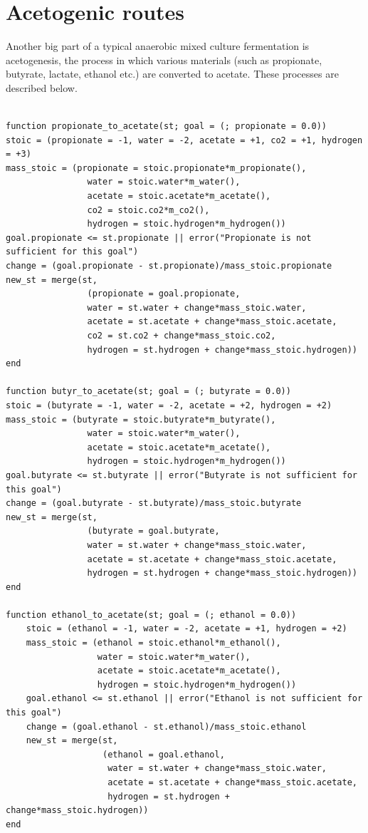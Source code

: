 \documentclass[11pt]{article}
\begin{document}
\section{Acetogenic routes}
\label{sec:org7d047e0}
Another big part of a typical anaerobic mixed culture fermentation is acetogenesis, the process in which various materials (such as propionate, butyrate, lactate, ethanol etc.) are converted to acetate. These processes are described below.

\begin{verbatim}

function propionate_to_acetate(st; goal = (; propionate = 0.0))
stoic = (propionate = -1, water = -2, acetate = +1, co2 = +1, hydrogen = +3)
mass_stoic = (propionate = stoic.propionate*m_propionate(),
                water = stoic.water*m_water(),
                acetate = stoic.acetate*m_acetate(),
                co2 = stoic.co2*m_co2(),
                hydrogen = stoic.hydrogen*m_hydrogen())
goal.propionate <= st.propionate || error("Propionate is not sufficient for this goal")
change = (goal.propionate - st.propionate)/mass_stoic.propionate
new_st = merge(st,
                (propionate = goal.propionate,
                water = st.water + change*mass_stoic.water,
                acetate = st.acetate + change*mass_stoic.acetate,
                co2 = st.co2 + change*mass_stoic.co2,
                hydrogen = st.hydrogen + change*mass_stoic.hydrogen))
end

function butyr_to_acetate(st; goal = (; butyrate = 0.0))
stoic = (butyrate = -1, water = -2, acetate = +2, hydrogen = +2)
mass_stoic = (butyrate = stoic.butyrate*m_butyrate(),
                water = stoic.water*m_water(),
                acetate = stoic.acetate*m_acetate(),
                hydrogen = stoic.hydrogen*m_hydrogen())
goal.butyrate <= st.butyrate || error("Butyrate is not sufficient for this goal")
change = (goal.butyrate - st.butyrate)/mass_stoic.butyrate
new_st = merge(st,
                (butyrate = goal.butyrate,
                water = st.water + change*mass_stoic.water,
                acetate = st.acetate + change*mass_stoic.acetate,
                hydrogen = st.hydrogen + change*mass_stoic.hydrogen))
end

function ethanol_to_acetate(st; goal = (; ethanol = 0.0))
    stoic = (ethanol = -1, water = -2, acetate = +1, hydrogen = +2)
    mass_stoic = (ethanol = stoic.ethanol*m_ethanol(),
                  water = stoic.water*m_water(),
                  acetate = stoic.acetate*m_acetate(),
                  hydrogen = stoic.hydrogen*m_hydrogen())
    goal.ethanol <= st.ethanol || error("Ethanol is not sufficient for this goal")
    change = (goal.ethanol - st.ethanol)/mass_stoic.ethanol
    new_st = merge(st,
                   (ethanol = goal.ethanol,
                    water = st.water + change*mass_stoic.water,
                    acetate = st.acetate + change*mass_stoic.acetate,
                    hydrogen = st.hydrogen + change*mass_stoic.hydrogen))
end


\end{verbatim}
\end{document}
